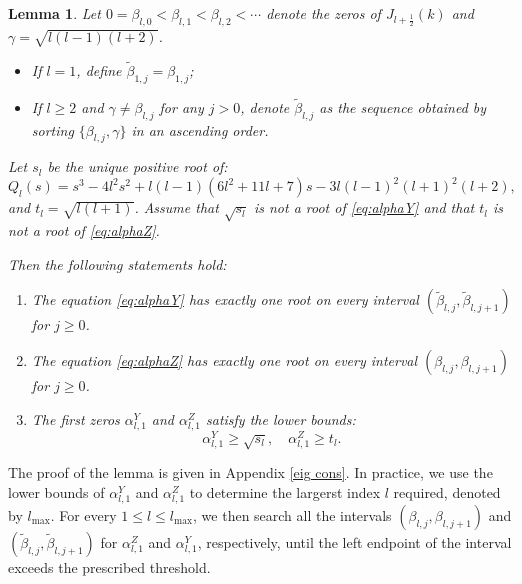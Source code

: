 \documentclass[11pt,a4paper]{article}
\numberwithin{equation}{section}
\newenvironment{enumeratenumeric}{\begin{enumerate}[1.] }{\end{enumerate}}
\newenvironment{itemizedot}{\begin{itemize} \renewcommand{\labelitemi}{$\bullet$}\renewcommand{\labelitemii}{$\bullet$}\renewcommand{\labelitemiii}{$\bullet$}\renewcommand{\labelitemiv}{$\bullet$}}{\end{itemize}}
\newtheorem{lemma}{Lemma}
\begin{document}
\begin{lemma}
  \label{lem:zeros}Let $0 = \beta_{l, 0} < \beta_{l, 1} < \beta_{l, 2} <
  \cdots$ denote the zeros of $J_{l + \frac{1}{2}} (k)$ and $\gamma = \sqrt{l
  (l - 1)  (l + 2)}$.
  \begin{itemizedot}
    \item If $l = 1$, define $\tilde{\beta}_{1, j} = \beta_{1, j}$;
    
    \item If $l \geqslant 2$ and $\gamma \neq \beta_{l, j}$ for any $j > 0$,
    denote $\tilde{\beta}_{l, j}$ as the sequence obtained by sorting
    $\{\beta_{l, j}, \gamma\}$ in an ascending order.
  \end{itemizedot}
  Let $s_l$ be the unique positive root of:
  \[ Q_l (s) = s^3 - 4 l^2 s^2 + l (l - 1)  (6 l^2 + 11 l + 7) s - 3 l (l -
     1)^2  (l + 1)^2  (l + 2), \]
  and $t_l = \sqrt{l (l + 1)}$. Assume that $\sqrt{s_l}$ is not a root of
  \eqref{eq:alphaY} and that $t_l$ is not a root of \eqref{eq:alphaZ}.
  
  Then the following statements hold:
  \begin{enumeratenumeric}
    \item The equation \eqref{eq:alphaY} has exactly one root on every
    interval $(\tilde{\beta}_{l, j}, \tilde{\beta}_{l, j + 1})$ for $j
    \geqslant 0$.
    
    \item The equation \eqref{eq:alphaZ} has exactly one root on every
    interval $(\beta_{l, j}, \beta_{l, j + 1})$ for $j \geqslant 0$.
    
    \item The first zeros $\alpha_{l, 1}^Y$ and $\alpha_{l, 1}^Z$ satisfy the
    lower bounds:
    \[ \alpha_{l, 1}^Y \geqslant \sqrt{s_l}, \quad \alpha_{l, 1}^Z \geqslant
       t_l . \]
  \end{enumeratenumeric}
\end{lemma}

The proof of the lemma is given in Appendix \ref{eig cons}. In practice, we
use the lower bounds of $\alpha_{l, 1}^Y$ and $\alpha_{l, 1}^Z$ to determine
the largerst index $l$ required, denoted by $l_{\max}$. For every $1 \leqslant
l \leqslant l_{\max}$, we then search all the intervals $(\beta_{l, j},
\beta_{l, j + 1})$ and $(\widetilde{\beta}_{l, j}, \widetilde{\beta}_{l, j + 1})$ for
$\alpha_{l, 1}^Z$ and $\alpha_{l, 1}^Y$, respectively, until the left endpoint
of the interval exceeds the prescribed threshold.
\end{document}
